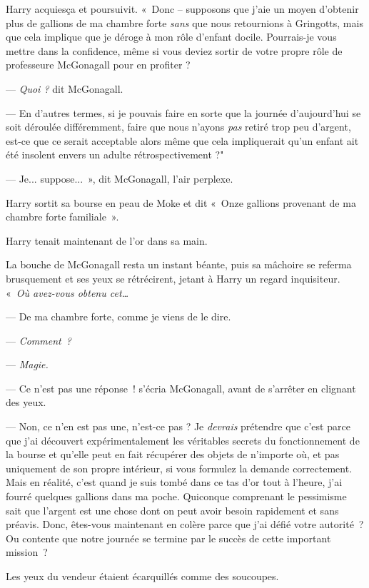 Harry acquiesça et poursuivit. «~Donc -- supposons que j'aie un moyen d'obtenir plus de gallions de ma chambre forte \emph{sans} que nous retournions à Gringotts, mais que cela implique que je déroge à mon rôle d'enfant docile.
Pourrais-je vous mettre dans la confidence, même si vous deviez sortir de votre propre rôle de professeure McGonagall pour en profiter ?

--- \emph{Quoi ?} dit McGonagall.

--- En d'autres termes, si je pouvais faire en sorte que la journée d'aujourd'hui se soit déroulée différemment, faire que nous n'ayons \emph{pas} retiré trop peu d'argent, est-ce que ce serait acceptable alors même que cela impliquerait qu'un enfant ait été insolent envers un adulte rétrospectivement ?"

--- Je... suppose...~», dit McGonagall, l'air perplexe.

Harry sortit sa bourse en peau de Moke et dit «~Onze gallions provenant de ma chambre forte familiale~».

Harry tenait maintenant de l'or dans sa main.

La bouche de McGonagall resta un instant béante, puis sa mâchoire se referma brusquement et  ses yeux se rétrécirent, jetant à Harry un regard inquisiteur. «~\emph{Où avez-vous obtenu cet…}

--- De ma chambre forte, comme je viens de le dire.

--- \emph{Comment~?}

--- \emph{Magie.}

--- Ce n'est pas une réponse~! s'écria McGonagall, avant de s'arrêter en clignant des yeux.

--- Non, ce n'en est pas une, n'est-ce pas ?
Je \emph{devrais} prétendre que c'est parce que j'ai découvert expérimentalement les véritables secrets du fonctionnement de la bourse et qu'elle peut en fait récupérer des objets de n'importe où, et pas uniquement de son propre intérieur, si vous formulez la demande correctement.
Mais en réalité, c'est quand je suis tombé dans ce tas d'or tout à l'heure, j'ai fourré quelques gallions dans ma poche.
Quiconque comprenant le pessimisme sait que l'argent est une chose dont on peut avoir besoin rapidement et sans préavis.
Donc, êtes-vous maintenant en colère parce que j'ai défié votre autorité~?
Ou contente que notre journée se termine par le succès de cette important mission~?

Les yeux du vendeur étaient écarquillés comme des soucoupes.

